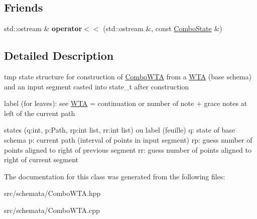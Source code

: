 \subsection*{Friends}
\begin{DoxyCompactItemize}
\item 
\mbox{\label{classComboState_a1fb7d424915082b80a6be103a22cb75e}} 
std\+::ostream \& {\bfseries operator$<$$<$} (std\+::ostream \&, const \mbox{\hyperlink{classComboState}{Combo\+State}} \&)
\end{DoxyCompactItemize}


\subsection{Detailed Description}
tmp state structure for construction of \mbox{\hyperlink{classComboWTA}{Combo\+W\+TA}} from a \mbox{\hyperlink{classWTA}{W\+TA}} (base schema) and an input segment casted into state\+\_\+t after construction 

label (for leaves)\+: see \mbox{\hyperlink{classWTA}{W\+TA}} = continuation or number of note + grace notes at left of the current path

states (q\+:int, p\+:Path, rp\+:int list, rr\+:int list) ou label (feuille) q\+: state of base schema p\+: current path (interval of points in input segment) rp\+: guess number of points aligned to right of previous segment rr\+: guess number of points aligned to right of current segment 

The documentation for this class was generated from the following files\+:\begin{DoxyCompactItemize}
\item 
src/schemata/Combo\+W\+T\+A.\+hpp\item 
src/schemata/Combo\+W\+T\+A.\+cpp\end{DoxyCompactItemize}
